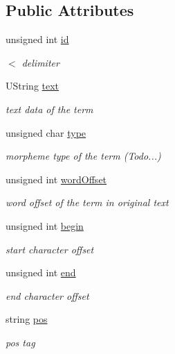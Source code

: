 \subsection*{Public Attributes}
\begin{CompactItemize}
\item 
unsigned int \hyperlink{classla__manager_1_1Term_11a2e90f4d10c183640b072356fd6b38}{id}
\begin{CompactList}\small\item\em $<$ delimiter \item\end{CompactList}\item 
UString \hyperlink{classla__manager_1_1Term_49c41450545995b9be0e34e05da6fbd1}{text}
\begin{CompactList}\small\item\em text data of the term \item\end{CompactList}\item 
unsigned char \hyperlink{classla__manager_1_1Term_6964a3845f56be2ee2627be3ef6266e5}{type}
\begin{CompactList}\small\item\em morpheme type of the term (Todo...) \item\end{CompactList}\item 
unsigned int \hyperlink{classla__manager_1_1Term_8625d3cd801afc5b6c587e0c38d9e323}{wordOffset}
\begin{CompactList}\small\item\em word offset of the term in original text \item\end{CompactList}\item 
unsigned int \hyperlink{classla__manager_1_1Term_59772600e59694bd583af17cef1c0b03}{begin}
\begin{CompactList}\small\item\em start character offset \item\end{CompactList}\item 
unsigned int \hyperlink{classla__manager_1_1Term_12f5d18ba13ca84aa99dbbff04eba947}{end}
\begin{CompactList}\small\item\em end character offset \item\end{CompactList}\item 
string \hyperlink{classla__manager_1_1Term_a4fef1d69d4868c0cc7a35b58c61d4aa}{pos}
\begin{CompactList}\small\item\em pos tag \item\end{CompactList}\end{CompactItemize}
